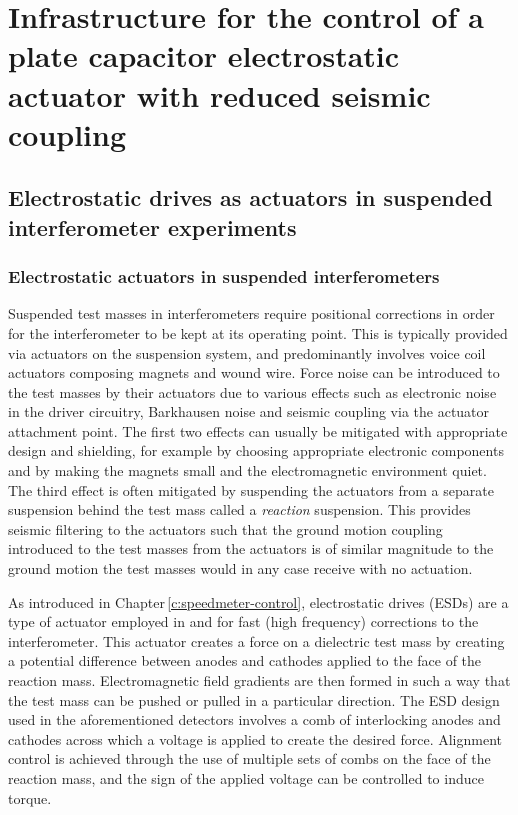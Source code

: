 \chapter{\label{c:esd-concept}Infrastructure for the control of a plate capacitor electrostatic actuator with reduced seismic coupling}

\section{Electrostatic drives as actuators in suspended interferometer experiments}

\subsection{Electrostatic actuators in suspended interferometers}
Suspended test masses in interferometers require positional corrections in order for the interferometer to be kept at its operating point. This is typically provided via actuators on the suspension system, and predominantly involves voice coil actuators composing magnets and wound wire. Force noise can be introduced to the test masses by their actuators due to various effects such as electronic noise in the driver circuitry, Barkhausen noise \cite{Weiss2008} and seismic coupling via the actuator attachment point. The first two effects can usually be mitigated with appropriate design and shielding, for example by choosing appropriate electronic components and by making the magnets small and the electromagnetic environment quiet. The third effect is often mitigated by suspending the actuators from a separate suspension behind the test mass called a \emph{reaction} suspension. This provides seismic filtering to the actuators such that the ground motion coupling introduced to the test masses from the actuators is of similar magnitude to the ground motion the test masses would in any case receive with no actuation.

As introduced in Chapter\,\ref{c:speedmeter-control}, electrostatic drives (\glspl{ESD}) are a type of actuator employed in \GEO{} and \ALIGO{} for fast (high frequency) corrections to the interferometer. This actuator creates a force on a dielectric test mass by creating a potential difference between anodes and cathodes applied to the face of the reaction mass. Electromagnetic field gradients are then formed in such a way that the test mass can be pushed or pulled in a particular direction. The \gls{ESD} design used in the aforementioned detectors involves a comb of interlocking anodes and cathodes across which a voltage is applied to create the desired force. Alignment control is achieved through the use of multiple sets of combs on the face of the reaction mass, and the sign of the applied voltage can be controlled to induce torque.

